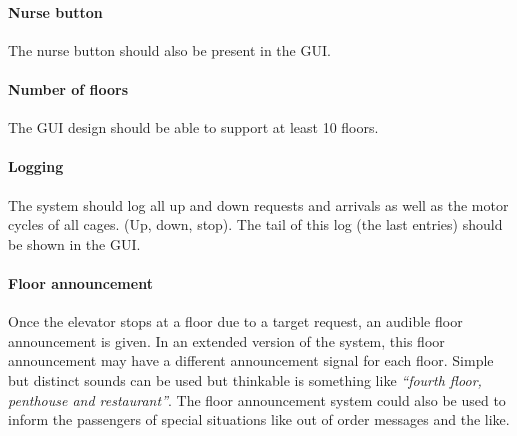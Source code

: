 \paragraph{Nurse button} The nurse button should also be present in
the GUI.

\paragraph{Number of floors} The GUI design should be able to support
at least 10 floors. 

\paragraph{Logging} The system should log all up and down requests and
arrivals as well as the motor cycles of all cages. (Up, down, stop).
The tail of this log (the last entries) should be shown in the GUI.

\paragraph{Floor announcement} Once the elevator stops at a floor due
to a target request, an audible floor announcement is given. In an
extended version of the system, this floor announcement may
have a different announcement signal for each floor. Simple but
distinct sounds can be used but thinkable is something like
\textit{``fourth floor, 
  penthouse and restaurant''}. The floor announcement system could
also be used to inform the passengers of special situations like out
of order messages and the like.


